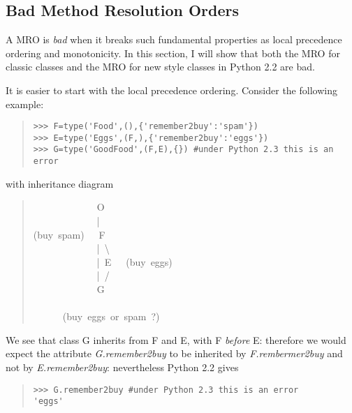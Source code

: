 \documentclass[10pt,english]{article}
\begin{document}

\hypertarget{bad-method-resolution-orders}{}
\subsection*{Bad Method Resolution Orders}

A MRO is \emph{bad} when it breaks such fundamental properties as local
precedence ordering and monotonicity.  In this section, I will show
that both the MRO for classic classes and the MRO for new style classes
in Python 2.2 are bad.

It is easier to start with the local precedence ordering.  Consider the
following example:
\begin{quote}
\begin{verbatim}>>> F=type('Food',(),{'remember2buy':'spam'})
>>> E=type('Eggs',(F,),{'remember2buy':'eggs'})
>>> G=type('GoodFood',(F,E),{}) #under Python 2.3 this is an error\end{verbatim}
\end{quote}

with inheritance diagram
\begin{quote}
\begin{ttfamily}\begin{flushleft}
\mbox{~~~~~~~~~~~~~O}\\
\mbox{~~~~~~~~~~~~~|}\\
\mbox{(buy~spam)~~~F}\\
\mbox{~~~~~~~~~~~~~|~{\textbackslash}}\\
\mbox{~~~~~~~~~~~~~|~E~~~(buy~eggs)}\\
\mbox{~~~~~~~~~~~~~|~/}\\
\mbox{~~~~~~~~~~~~~G}\\
\mbox{}\\
\mbox{~~~~~~(buy~eggs~or~spam~?)}
\end{flushleft}\end{ttfamily}
\end{quote}

We see that class G inherits from F and E, with F \emph{before} E:  therefore
we would expect the attribute \emph{G.remember2buy} to be inherited by
\emph{F.rembermer2buy} and not by \emph{E.remember2buy}:  nevertheless Python 2.2
gives
\begin{quote}
\begin{verbatim}>>> G.remember2buy #under Python 2.3 this is an error
'eggs'\end{verbatim}
\end{quote}
\end{document}
